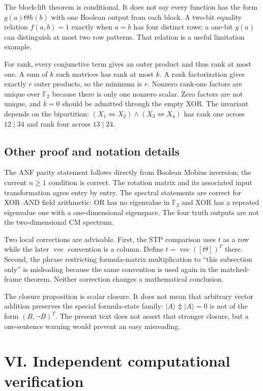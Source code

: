 \documentclass[
  10pt,
]{article}
\begin{document}
The block-lift theorem is conditional. It does not say every function
has the form \(g(a)\Theta h(b)\) with one Boolean output from each
block. A two-bit equality relation \(f(a,b)=1\) exactly when \(a=b\) has
four distinct rows; a one-bit \(g(a)\) can distinguish at most two row
patterns. That relation is a useful limitation example.

For rank, every conjunctive term gives an outer product and thus rank at
most one. A sum of \(k\) such matrices has rank at most \(k\). A rank
factorization gives exactly \(r\) outer products, so the minimum is
\(r\). Nonzero rank-one factors are unique over \(\mathbb F_2\) because
there is only one nonzero scalar. Zero factors are not unique, and
\(k=0\) should be admitted through the empty XOR. The invariant depends
on the bipartition:
\((X_1\Leftrightarrow X_2)\land(X_3\Leftrightarrow X_4)\) has rank one
across \(12\mid34\) and rank four across \(13\mid24\).

\subsection{Other proof and notation
details}\label{other-proof-and-notation-details}

The ANF parity statement follows directly from Boolean Mobius inversion;
the current \(n\ge1\) condition is correct. The rotation matrix and its
associated input transformation agree entry by entry. The spectral
statements are correct for XOR--AND field arithmetic: OR has no
eigenvalue in \(\mathbb F_2\) and XOR has a repeated eigenvalue one with
a one-dimensional eigenspace. The four truth outputs are not the
two-dimensional CM spectrum.

Two local corrections are advisable. First, the STP comparison uses
\(t\) as a row while the later \(\operatorname{vec}\) convention is a
column. Define \(t=\operatorname{vec}([\Theta])^T\) there. Second, the
phrase restricting formula-matrix multiplication to ``this subsection
only'' is misleading because the same convention is used again in the
matched-frame theorem. Neither correction changes a mathematical
conclusion.

The closure proposition is scalar closure. It does not mean that
arbitrary vector addition preserves the special formula-state family:
\(|A\rangle\Updownarrow|A\rangle=0\) is not of the form
\((B,\neg B)^T\). The present text does not assert that stronger
closure, but a one-sentence warning would prevent an easy misreading.

\section{VI. Independent computational
verification}\label{vi.-independent-computational-verification}
\end{document}
